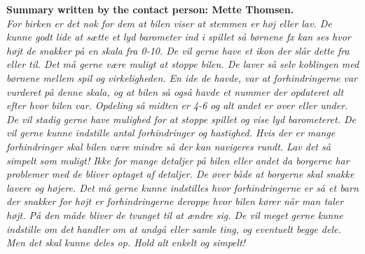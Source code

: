\label{app:interview-2014-04-03}\textbf{Summary written by the contact person: Mette Thomsen.}
\\
\textit{For birken er det nok for dem at bilen viser at stemmen er høj eller lav. De kunne godt lide at sætte et lyd barometer ind i spillet så børnene fx kan ses hvor højt de snakker på en skala fra 0-10. De vil gerne have et ikon der slår dette fra eller til. Det må gerne være muligt at stoppe bilen. De laver så selv koblingen med børnene mellem spil og virkeligheden. En ide de havde, var at forhindringerne var vurderet på denne skala, og at bilen så også havde et nummer der opdateret alt efter hvor bilen var. Opdeling så midten er 4-6 og alt andet er over eller under. De vil stadig gerne have mulighed for at stoppe spillet og vise lyd barometeret. De vil gerne kunne indstille antal forhindringer og hastighed. Hvis der er mange forhindringer skal bilen være mindre så der kan navigeres rundt. Lav det så simpelt som muligt! Ikke for mange detaljer på bilen eller andet da borgerne har problemer med de bliver optaget af detaljer. De øver både at borgerne skal snakke lavere og højere. Det må gerne kunne indstilles hvor forhindringerne er så et barn der snakker for højt er forhindringerne deroppe hvor bilen kører når man taler højt. På den måde bliver de tvunget til at ændre sig. De vil meget gerne kunne indstille om det handler om at undgå eller samle ting, og eventuelt begge dele. Men det skal kunne deles op. Hold alt enkelt og simpelt!}